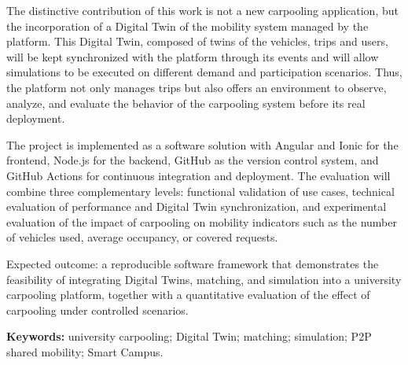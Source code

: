 The distinctive contribution of this work is not a new carpooling application, but the incorporation of a Digital Twin of the mobility system managed by the platform. This Digital Twin, composed of twins of the vehicles, trips and users, will be kept synchronized with the platform through its events and will allow simulations to be executed on different demand and participation scenarios. Thus, the platform not only manages trips but also offers an environment to observe, analyze, and evaluate the behavior of the carpooling system before its real deployment.

The project is implemented as a software solution with Angular and Ionic for the frontend, Node.js for the backend, GitHub as the version control system, and GitHub Actions for continuous integration and deployment. The evaluation will combine three complementary levels: functional validation of use cases, technical evaluation of performance and Digital Twin synchronization, and experimental evaluation of the impact of carpooling on mobility indicators such as the number of vehicles used, average occupancy, or covered requests.

Expected outcome: a reproducible software framework that demonstrates the feasibility of integrating Digital Twins, matching, and simulation into a university carpooling platform, together with a quantitative evaluation of the effect of carpooling under controlled scenarios.

\textbf{Keywords:} university carpooling; Digital Twin; matching; simulation; P2P shared mobility; Smart Campus.
